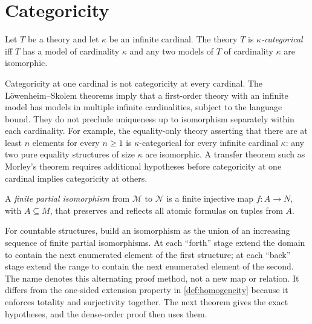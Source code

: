 \section{Categoricity}
\label{sec:qe-categoricity-02}

\begin{definition}[Categoricity]
Let \(T\) be a theory and let \(\kappa\) be an infinite cardinal.  The theory
\(T\) is \emph{\(\kappa\)-categorical} iff \(T\) has a model of cardinality
\(\kappa\) and any two models of \(T\) of cardinality \(\kappa\) are
isomorphic.
\end{definition}

\begin{warning}
Categoricity at one cardinal is not categoricity at every cardinal.  The
L\"owenheim--Skolem theorems imply that a first-order theory with an infinite
model has models in multiple infinite cardinalities, subject to the language
bound.  They do not preclude uniqueness up to isomorphism separately within
each cardinality.  For example, the equality-only theory asserting that there
are at least \(n\) elements for every \(n\geq1\) is
\(\kappa\)-categorical for every infinite cardinal \(\kappa\): any two pure
equality structures of size \(\kappa\) are isomorphic.  A transfer theorem
such as Morley's theorem requires additional hypotheses before categoricity at
one cardinal implies categoricity at others.
\end{warning}

\begin{definition}
A \emph{finite partial isomorphism} from \(\mathcal M\) to \(\mathcal N\) is a
finite injective map \(f:A\to N\), with \(A\subseteq M\), that preserves and
reflects all atomic formulas on tuples from \(A\).
\end{definition}

\begin{method}
\label{method:back-and-forth}
For countable structures, build an isomorphism as the union of an increasing
sequence of finite partial isomorphisms.  At each ``forth'' stage extend the
domain to contain the next enumerated element of the first structure; at each
``back'' stage extend the range to contain the next enumerated element of the
second.  The name denotes this alternating proof method, not a new map or
relation.  It differs from the one-sided extension property in
\cref{def:homogeneity} because it enforces totality and surjectivity together.
The next theorem gives the exact hypotheses, and the dense-order proof then
uses them.
\end{method}

